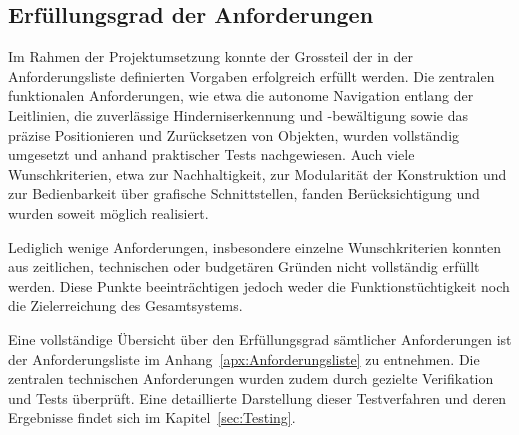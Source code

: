 \documentclass[main.tex]{subfiles} %
\begin{document}

\subsection{Erfüllungsgrad der Anforderungen}

Im Rahmen der Projektumsetzung konnte der Grossteil der in der Anforderungsliste definierten Vorgaben 
erfolgreich erfüllt werden. Die zentralen funktionalen Anforderungen, wie etwa die autonome Navigation 
entlang der Leitlinien, die zuverlässige Hinderniserkennung und -bewältigung sowie das präzise 
Positionieren und Zurücksetzen von Objekten, wurden vollständig umgesetzt und anhand praktischer 
Tests nachgewiesen. Auch viele Wunschkriterien, etwa zur Nachhaltigkeit, zur Modularität der 
Konstruktion und zur Bedienbarkeit über grafische Schnittstellen, fanden Berücksichtigung und 
wurden soweit möglich realisiert.

Lediglich wenige Anforderungen, insbesondere einzelne Wunschkriterien konnten aus
zeitlichen, technischen oder budgetären Gründen nicht vollständig erfüllt werden. 
Diese Punkte beeinträchtigen jedoch weder die Funktionstüchtigkeit noch die Zielerreichung des Gesamtsystems.

Eine vollständige Übersicht über den Erfüllungsgrad sämtlicher Anforderungen ist der 
Anforderungsliste im Anhang~\ref{apx:Anforderungsliste}  zu entnehmen. Die zentralen technischen Anforderungen wurden zudem 
durch gezielte Verifikation und Tests überprüft. Eine detaillierte Darstellung dieser 
Testverfahren und deren Ergebnisse findet sich im Kapitel~\ref{sec:Testing}.
\end{document}
